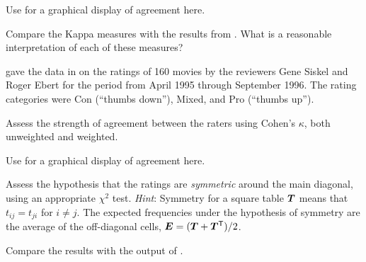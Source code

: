 \documentclass[10pt]{report}\usepackage[]{graphicx}\usepackage[]{color}
\begin{document}
\begin{Exercises}
\begin{enumerate*}
      \item Use  for a graphical display of agreement here.
      \begin{ans}
      \end{ans}
      
      \item Compare the Kappa measures with the results from . 
      What is a reasonable interpretation of each of these measures?
      \begin{ans}
      \end{ans}
      
    \end{enumerate*}

  \exercise \citet{AgrestiWinner:1997} gave the data in  on the
  ratings of 160 movies by the reviewers Gene Siskel and Roger Ebert for the period
  from April 1995 through September 1996. The rating categories were Con (``thumbs down''),
  Mixed, and Pro (``thumbs up'').
  
  \begin{enumerate*}
     \item Assess the strength of agreement between the raters using Cohen's
       $\kappa$, both unweighted and weighted.
       \begin{ans}
       \end{ans}
       
     \item Use  for a graphical display of agreement here.
     \begin{ans}
     \end{ans}
     
     \item Assess the hypothesis that the ratings are \emph{symmetric} around the
       main diagonal, using an appropriate $\chi^2$ test.
       \emph{Hint}:  Symmetry for a square table $\bm{T}$ means that $t_{ij} = t_{ji}$
       for $i \ne j$.  The expected frequencies under the hypothesis of symmetry
       are the average of the off-diagonal cells,
       $\bm{E} = (\bm{T} + \bm{T}^\mathsf{T}) / 2$.
     \begin{ans}
     \end{ans}
     
     \item Compare the results with the output of .
     \begin{ans}
     \end{ans}
     

\end{enumerate*}
\end{Exercises}
\end{document}
